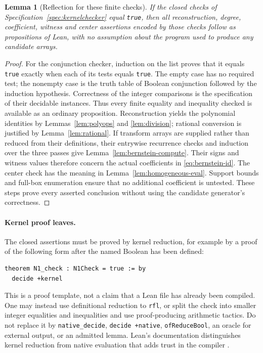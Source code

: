 \documentclass[11pt,a4paper]{article}
\newtheorem{lemma}{Lemma}[section]
\theoremstyle{definition}
\newcommand{\lean}[1]{{\small\nolinkurl{#1}}}
\begin{document}
\begin{lemma}[Reflection for these finite checks]\label{lem:check-sound}
If the closed checks of Specification~\ref{spec:kernelchecker} equal \lean{true}, then all reconstruction, degree, coefficient, witness and center assertions encoded by those checks follow as propositions of Lean, with no assumption about the program used to produce any candidate arrays.
\end{lemma}
\begin{proof}
For the conjunction checker, induction on the list proves that it equals \lean{true} exactly when each of its tests equals \lean{true}. The empty case has no required test; the nonempty case is the truth table of Boolean conjunction followed by the induction hypothesis. Correctness of the integer comparisons is the specification of their decidable instances. Thus every finite equality and inequality checked is available as an ordinary proposition.
Reconstruction yields the polynomial identities by Lemmas~\ref{lem:polyops} and \ref{lem:division}; rational conversion is justified by Lemma~\ref{lem:rational}. If transform arrays are supplied rather than reduced from their definitions, their entrywise recurrence checks and induction over the three passes give Lemma~\ref{lem:bernstein-compute}. Their signs and witness values therefore concern the actual coefficients in \eqref{eq:bernstein-id}. The center check has the meaning in Lemma~\ref{lem:homogeneous-eval}. Support bounds and full-box enumeration ensure that no additional coefficient is untested. These steps prove every asserted conclusion without using the candidate generator's correctness.
\end{proof}

\paragraph{Kernel proof leaves.}
The closed assertions must be proved by kernel reduction, for example by a proof of the following form after the named Boolean has been defined:
\begin{lstlisting}
theorem N1_check : N1Check = true := by
  decide +kernel
\end{lstlisting}
This is a proof template, not a claim that a Lean file has already been compiled. One may instead use definitional reduction to \lean{rfl}, or split the check into smaller integer equalities and inequalities and use proof-producing arithmetic tactics. Do not replace it by \lean{native_decide}, \lean{decide +native}, \lean{ofReduceBool}, an oracle for external output, or an admitted lemma. Lean's documentation distinguishes kernel reduction from native evaluation that adds trust in the compiler \cite{lean-validation,lean-tactics}.
\end{document}
